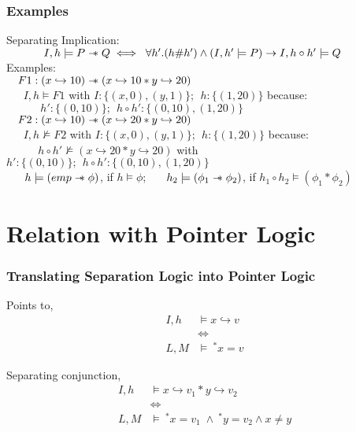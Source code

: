 \documentclass{beamer}
\newcommand\sepimp{\mathrel{-\mkern-6mu*}}
\begin{document}
\begin{frame}
\frametitle{Examples}
Separating Implication: $~~~~~~~~~~\tiny{I,h \models P \sepimp Q 
    \iff \; \forall h'.(h \# h') \land (I,h' \models P) \to I,h \circ h' \models Q}$ \\[0.25cm]

Examples: \\
$~~~F1 : (x \hookrightarrow 10) \sepimp (x \hookrightarrow 10 * y \hookrightarrow 20)$ \\
$~~~~~~~I,h \models F1$ with $I : \{(x,0), (y,1)\};~~h : \{(1,20) \}$ because:
$~~~~~~~~~~~~~~h' : \{(0,10)\};~~h \circ h' : \{(0,10), (1,20)\}$ \\[0.2cm]

$~~~F2 : (x \hookrightarrow 10) \sepimp (x \hookrightarrow 20 * y \hookrightarrow 20)$ \\
$~~~~~~~I,h \not\models F2$ with $I : \{(x,0), (y,1)\};~~h : \{(1,20) \}$ because:
\small{$~~~~~~~~~~~~~h \circ h' \not\models (x \hookrightarrow 20 * y \hookrightarrow 20)$ with $h' : \{(0,10)\};~~h \circ h' : \{(0,10), (1,20)\}$}\\[0.2cm]
$~~~~~h \models( emp \sepimp \phi)$, if $h \models \phi$; ~~~$h_2 \models (\phi_1 \sepimp \phi_2)$, if $h_1 \circ h_2 \models (\phi_1 * \phi_2)$

\end{frame}

\section{Relation with Pointer Logic}

\begin{frame}
\frametitle{Translating Separation Logic into Pointer Logic}
Points to,
\begin{align*}
    I,h & \models x \hookrightarrow v \\
    & \Longleftrightarrow \\
    L,M & \models \ ^*x = v
\end{align*}

Separating conjunction,
\begin{align*}
    I,h & \models x \hookrightarrow v_1 * y \hookrightarrow v_2 \\
    & \Longleftrightarrow \\
    L,M & \models \ ^*x = v_1 \; \land \ ^*y = v_2 \land x \neq y
\end{align*}
\end{frame}
\end{document}
